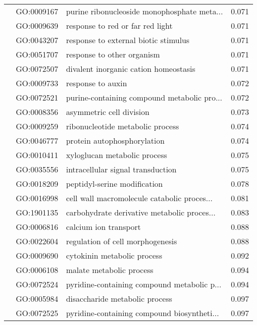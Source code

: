 \begin{longtable}{lllr}
   & GO:0009167 &  purine ribonucleoside monophosphate meta... &         0.071 \\
   & GO:0009639 &             response to red or far red light &         0.071 \\
   & GO:0043207 &         response to external biotic stimulus &         0.071 \\
   & GO:0051707 &                   response to other organism &         0.071 \\
   & GO:0072507 &        divalent inorganic cation homeostasis &         0.071 \\
   & GO:0009733 &                            response to auxin &         0.072 \\
   & GO:0072521 &  purine-containing compound metabolic pro... &         0.072 \\
   & GO:0008356 &                     asymmetric cell division &         0.073 \\
   & GO:0009259 &             ribonucleotide metabolic process &         0.074 \\
   & GO:0046777 &                  protein autophosphorylation &         0.074 \\
   & GO:0010411 &                 xyloglucan metabolic process &         0.075 \\
   & GO:0035556 &            intracellular signal transduction &         0.075 \\
   & GO:0018209 &                 peptidyl-serine modification &         0.078 \\
   & GO:0016998 &  cell wall macromolecule catabolic proces... &         0.081 \\
   & GO:1901135 &  carbohydrate derivative metabolic proces... &         0.083 \\
   & GO:0006816 &                        calcium ion transport &         0.088 \\
   & GO:0022604 &             regulation of cell morphogenesis &         0.088 \\
   & GO:0009690 &                  cytokinin metabolic process &         0.092 \\
   & GO:0006108 &                     malate metabolic process &         0.094 \\
   & GO:0072524 &  pyridine-containing compound metabolic p... &         0.094 \\
   & GO:0005984 &               disaccharide metabolic process &         0.097 \\
   & GO:0072525 &  pyridine-containing compound biosyntheti... &         0.097 \\

\end{longtable}
